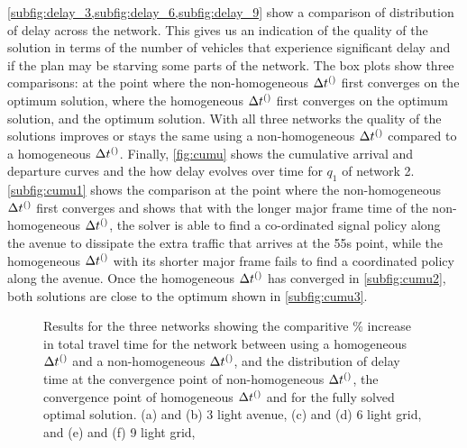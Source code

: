 \cref{subfig:delay_3,subfig:delay_6,subfig:delay_9} show a comparison of distribution of delay across the network. This gives us an indication of the quality of the solution in terms of the number of vehicles that experience significant delay and if the plan may be starving some parts of the network.  The box plots show three comparisons: at the point where the non-homogeneous $\DT[]$ first converges on the optimum solution, where the homogeneous $\DT[]$ first converges on the optimum solution, and the optimum solution. With all three networks the quality of the solutions improves or stays the same using a non-homogeneous $\DT[]$ compared to a homogeneous $\DT[]$.
Finally, \cref{fig:cumu} shows the cumulative arrival and departure curves and the how delay evolves over time for $q_1$ of network 2. \cref{subfig:cumu1} shows the comparison at the point where the non-homogeneous $\DT[]$ first converges and shows that with the longer major frame time of the non-homogeneous $\DT[]$, the solver is able to find a co-ordinated signal policy along the avenue to dissipate the extra traffic that arrives at the 55s point, while the homogeneous $\DT[]$ with its shorter major frame fails to find a coordinated policy along the avenue. Once the homogeneous $\DT[]$ has converged in \cref{subfig:cumu2}, both solutions are close to the optimum shown in \cref{subfig:cumu3}.

\begin{figure*}[t!]
\centering



\caption{Results for the three networks showing the comparitive \% increase in total travel time for the network between using a homogeneous $\DT[]$ and a non-homogeneous $\DT[]$, and the distribution of delay time at the convergence point of non-homogeneous $\DT[]$, the convergence point of homogeneous $\DT[]$ and for the fully solved optimal solution. (a) and (b) 3 light avenue, (c) and (d) 6 light grid, and (e) and (f) 9 light grid,}
\label{fig:results}
\end{figure*}

